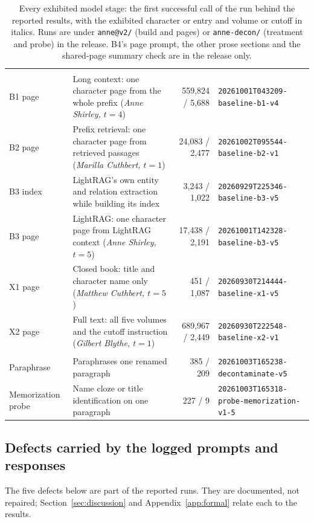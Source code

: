 \begin{table}[!ht]
\begin{tabular}{@{}>{\raggedright\arraybackslash}p{3.0cm}>{\raggedright\arraybackslash}p{6.3cm}r>{\raggedright\arraybackslash}p{3.75cm}@{}}
\midrule
\multicolumn{4}{@{}l}{\emph{Comparison systems and diagnostics}} \\
B1 page & Long context: one character page from the whole prefix (\emph{Anne Shirley, $t{=}4$}) & 559,824 / 5,688 & \nolinkurl{20261001T043209-baseline-b1-v4} \\
B2 page & Prefix retrieval: one character page from retrieved passages (\emph{Marilla Cuthbert, $t{=}1$}) & 24,083 / 2,477 & \nolinkurl{20261002T095544-baseline-b2-v1} \\
B3 index & LightRAG's own entity and relation extraction while building its index & 3,243 / 1,022 & \nolinkurl{20260929T225346-baseline-b3-v5} \\
B3 page & LightRAG: one character page from LightRAG context (\emph{Anne Shirley, $t{=}5$}) & 17,438 / 2,191 & \nolinkurl{20261001T142328-baseline-b3-v5} \\
X1 page & Closed book: title and character name only (\emph{Matthew Cuthbert, $t{=}5$}) & 451 / 1,087 & \nolinkurl{20260930T214444-baseline-x1-v5} \\
X2 page & Full text: all five volumes and the cutoff instruction (\emph{Gilbert Blythe, $t{=}1$}) & 689,967 / 2,449 & \nolinkurl{20260930T222548-baseline-x2-v1} \\
\midrule
\multicolumn{4}{@{}l}{\emph{Treated text and recognition}} \\
Paraphrase & Paraphrases one renamed paragraph & 385 / 209 & \nolinkurl{20261003T165238-decontaminate-v5} \\
Memorization probe & Name cloze or title identification on one paragraph & 227 / 9 & \nolinkurl{20261003T165318-probe-memorization-v1-5} \\
\bottomrule
\end{tabular}
\caption{Every exhibited model stage: the first successful call of the run behind the reported
results, with the exhibited character or entry and volume or cutoff in italics. Runs are under \nolinkurl{anne@v2/} (build and pages) or \nolinkurl{anne-decon/}
(treatment and probe) in the release. B4's page prompt, the other prose sections and the
shared-page summary check are in the release only.}
\label{tab:prompt-stages}
\end{table}

\subsection{Defects carried by the logged prompts and responses}
The five defects below are part of the reported runs. They are documented, not repaired;
Section~\ref{sec:discussion} and Appendix~\ref{app:formal} relate each to the results.

